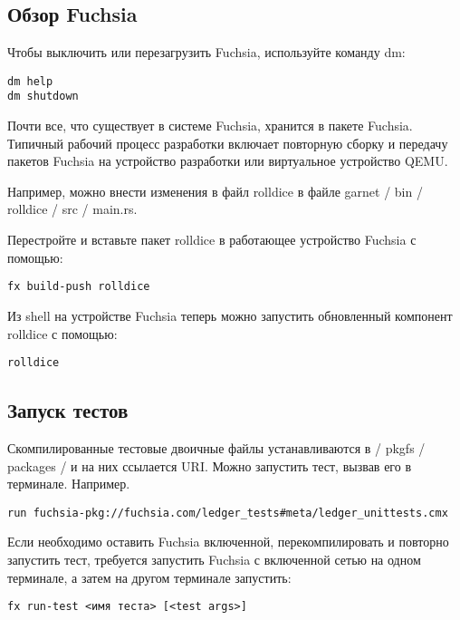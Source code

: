 \documentclass[14pt,a4paper]{article}
\begin{document}
\subsection{Обзор Fuchsia}

Чтобы выключить или перезагрузить Fuchsia, используйте команду dm:

\begin{lstlisting}
dm help
dm shutdown
\end{lstlisting}

Почти все, что существует в системе Fuchsia, хранится в пакете Fuchsia. Типичный рабочий процесс разработки включает повторную сборку и передачу пакетов Fuchsia на устройство разработки или виртуальное устройство QEMU.\\

\par Например, можно внести изменения в файл rolldice в файле garnet / bin / rolldice / src / main.rs. \\

\par Перестройте и вставьте пакет rolldice в работающее устройство Fuchsia с помощью:

\begin{lstlisting}
fx build-push rolldice
\end{lstlisting}

Из shell на устройстве Fuchsia теперь можно запустить обновленный компонент rolldice с помощью:

\begin{lstlisting}
rolldice
\end{lstlisting}

\subsection{Запуск тестов}
Скомпилированные тестовые двоичные файлы устанавливаются в / pkgfs / packages / и на них ссылается URI. Можно запустить тест, вызвав его в терминале. Например.

\begin{lstlisting}
run fuchsia-pkg://fuchsia.com/ledger_tests#meta/ledger_unittests.cmx
\end{lstlisting}

Если необходимо оставить Fuchsia включенной, перекомпилировать и повторно запустить тест, требуется запустить Fuchsia с включенной сетью на одном терминале, а затем на другом терминале запустить:

\begin{lstlisting}
fx run-test <имя теста> [<test args>]
\end{lstlisting}
\end{document}
